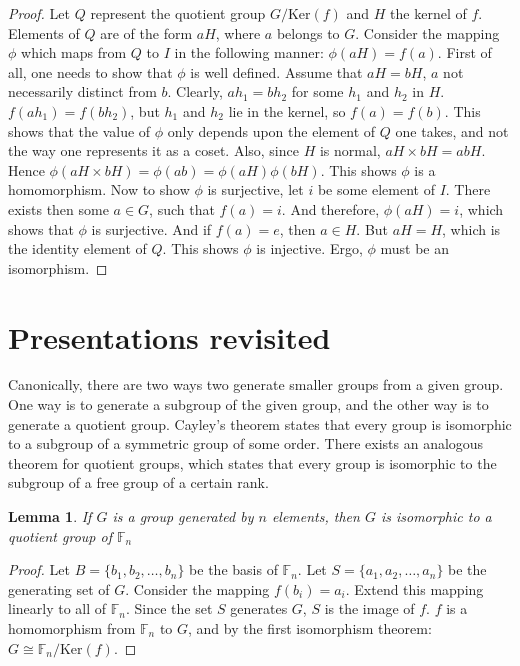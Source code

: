\documentclass[12pt, titlepage]{article}
\newtheorem{lem}[thm]{Lemma}
\theoremstyle{definition}
\begin{document}
\begin{proof}
Let $Q$ represent the quotient group $G/\mathrm{Ker}(f)$ and $H$ the kernel of $f$. Elements of $Q$ are of the form $aH$, where $a$ belongs to $G$. Consider the mapping $\phi$ which maps from $Q$ to $I$ in the following manner: $\phi(aH) = f(a)$. First of all, one needs to show that $\phi$ is well defined. Assume that $aH=bH$, $a$ not necessarily distinct from $b$. Clearly, $ah_1=bh_2$ for some $h_1$ and $h_2$ in $H$. $f(ah_1)=f(bh_2)$, but $h_1$ and $h_2$ lie in the kernel, so $f(a)=f(b)$. This shows that the value of $\phi$ only depends upon the element of $Q$ one takes, and not the way one represents it as a coset. Also, since $H$ is normal, $aH \times bH=abH$. Hence $\phi(aH \times bH) = \phi(ab) = \phi(aH)\phi(bH)$. This shows $\phi$ is a homomorphism. Now to show $\phi$ is surjective, let $i$ be some element of $I$. There exists then some $a \in G$, such that $f(a)=i$. And therefore, $\phi(aH)=i$, which shows that $\phi$ is surjective. And if $f(a)=e$, then $a \in H$. But $aH=H$, which is the identity element of $Q$. This shows $\phi$ is injective. Ergo, $\phi$ must be an isomorphism.
\end{proof}

\section{Presentations revisited}

Canonically, there are two ways two generate smaller groups from a given group. One way is to generate a subgroup of the given group, and the other way is to generate a quotient group. Cayley's theorem states that every group is isomorphic to a subgroup of a symmetric group of some order. There exists an analogous theorem for quotient groups, which states that every group is isomorphic to the subgroup of a free group of a certain rank.

\begin{lem}\cite{meier}\label{quotient}
If $G$ is a group generated by $n$ elements, then $G$ is isomorphic to a quotient group of $\mathbb{F}_n$
\end{lem}

\begin{proof}
Let $B= \{b_1, b_2, \ldots , b_n\}$ be the basis of $\mathbb{F}_n$. Let $S=\{a_1, a_2, \ldots, a_n\}$ be the generating set of $G$. Consider the mapping $f(b_i)=a_i$. Extend this mapping linearly to all of $\mathbb{F}_n$. Since the set $S$ generates $G$, $S$ is the image of $f$. $f$ is a homomorphism from $\mathbb{F}_n$ to $G$, and by the first isomorphism theorem: $G \cong \mathbb{F}_n/\mathrm{Ker}(f)$. 
\end{proof}
\end{document}
